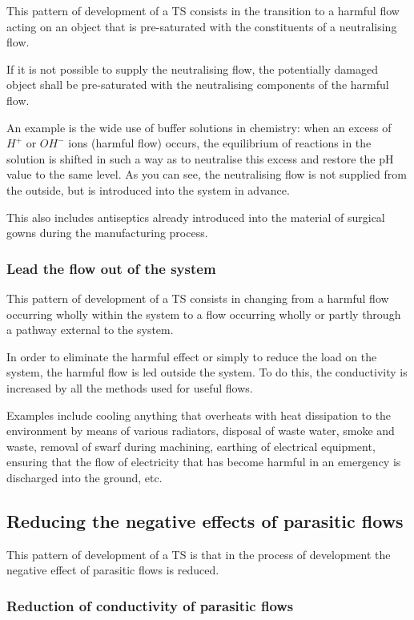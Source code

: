\documentclass[a4paper,11pt]{article}
\begin{document}
This pattern of development of a TS consists in the transition to a harmful
flow acting on an object that is pre-saturated with the constituents of a
neutralising flow.

If it is not possible to supply the neutralising flow, the potentially damaged
object shall be pre-saturated with the neutralising components of the harmful
flow.

An example is the wide use of buffer solutions in chemistry: when an excess of
$H^+$ or $OH^-$ ions (harmful flow) occurs, the equilibrium of reactions in
the solution is shifted in such a way as to neutralise this excess and restore
the pH value to the same level. As you can see, the neutralising flow is not
supplied from the outside, but is introduced into the system in advance.

This also includes antiseptics already introduced into the material of
surgical gowns during the manufacturing process.

\subsubsection{Lead the flow out of the system}

This pattern of development of a TS consists in changing from a harmful
flow occurring wholly within the system to a flow occurring wholly or partly
through a pathway external to the system.

In order to eliminate the harmful effect or simply to reduce the load on the
system, the harmful flow is led outside the system. To do this, the
conductivity is increased by all the methods used for useful flows.

Examples include cooling anything that overheats with heat dissipation to the
environment by means of various radiators, disposal of waste water, smoke and
waste, removal of swarf during machining, earthing of electrical equipment,
ensuring that the flow of electricity that has become harmful in an emergency
is discharged into the ground, etc.

\subsection{Reducing the negative effects of parasitic flows}

This pattern of development of a TS is that in the process of development the
negative effect of parasitic flows is reduced.

\subsubsection{Reduction of conductivity of parasitic flows}
\end{document}
